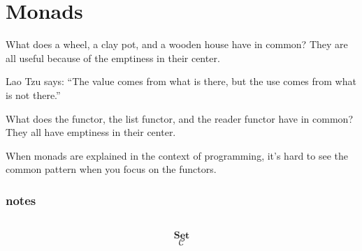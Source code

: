 \documentclass[DaoFP]{subfiles}
\begin{document}
\setcounter{chapter}{12}

\chapter{Monads}

What does a wheel, a clay pot, and a wooden house have in common? They are all useful because of the emptiness in their center. 

Lao Tzu says: ``The value comes from what is there, but the use comes from what is not there.''

What does the  functor, the list functor, and the reader functor have in common? They all have emptiness in their center. 

When monads are explained in the context of programming, it's hard to see the common pattern when you focus on the functors. 

\subsection{notes}


\begin{exercise}
\end{exercise}

\begin{haskell}
\end{haskell}

\[
 \begin{tikzcd}
  \end{tikzcd}
\]

\[   \mathbf{Set} \]
\[   \mathcal{C} \]
\end{document}
